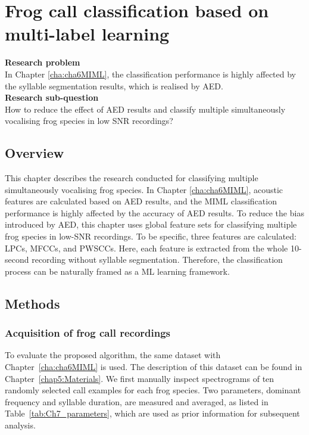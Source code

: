 
\chapter{Frog call classification based on multi-label learning}
\label{cha:cha7ML}
\textbf{Research problem}
\\
In Chapter \ref{cha:cha6MIML}, the classification performance is highly affected by the syllable segmentation results, which is realised by AED. 
\\
\textbf{Research sub-question}
\\
How to reduce the effect of AED results and classify multiple simultaneously vocalising frog species in low SNR recordings?


\section{Overview}
\label{sect:introduction}

This chapter describes the research conducted for classifying multiple simultaneously vocalising frog species. In Chapter \ref{cha:cha6MIML}, acoustic features are calculated based on AED results, and the MIML classification performance is highly affected by the accuracy of AED results. To reduce the bias introduced by AED, this chapter uses global feature sets for classifying multiple frog species in low-SNR recordings.
To be specific, three features are calculated: LPCs, MFCCs, and PWSCCs. Here, each feature is extracted from the whole 10-second recording without  syllable segmentation. Therefore, the classification process can be naturally framed as a ML learning framework.  



  



\section{Methods}

\subsection{Acquisition of frog call recordings}

To evaluate the proposed algorithm, the same dataset with Chapter~\ref{cha:cha6MIML} is used. The description of this dataset can be found in Chapter~\ref{chap5:Materials}. We first manually inspect spectrograms of ten randomly selected call examples for each frog species. Two parameters, dominant frequency and syllable duration, are measured and averaged, as listed in Table~\ref{tab:Ch7_parameters}, which are used as prior information for subsequent analysis.



